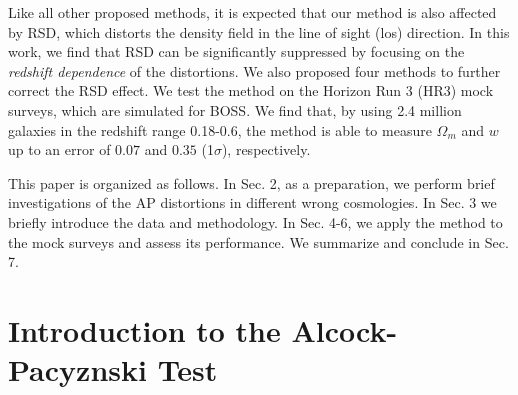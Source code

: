 \documentclass{emulateapj}
\begin{document}
Like all other proposed methods, it is expected that our method is also affected by RSD,
which distorts the density field in the line of sight (los) direction.
In this work, we find that RSD can be significantly suppressed by focusing on the {\it redshift dependence} of the distortions.
We also proposed four methods to further correct the RSD effect.
We test the method on the Horizon Run 3 (HR3) mock surveys, which are simulated for BOSS.
We find that, by using 2.4 million galaxies in the redshift range 0.18-0.6, 
the method is able to measure $\Omega_m$ and $w$ up to an error of $0.07$ and $0.35$ (1$\sigma$), respectively.

This paper is organized as follows.
In Sec. 2, as a preparation, we perform brief investigations of the AP distortions in different wrong cosmologies.
In Sec. 3 we briefly introduce the data and methodology.
In Sec. 4-6, we apply the method to the mock surveys and assess its performance.
We summarize and conclude in Sec. 7.

\section{Introduction to the Alcock-Pacyznski Test}
\end{document}
